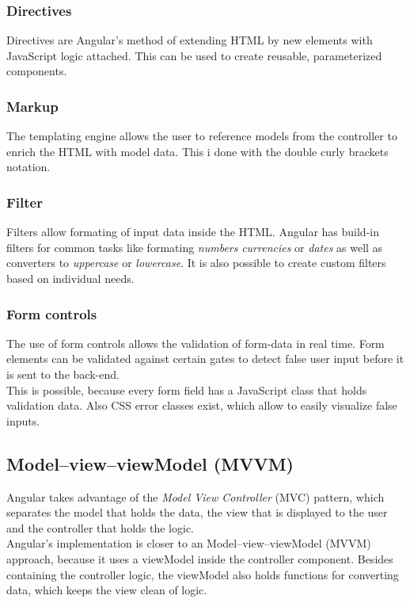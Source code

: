 \subsubsection{Directives}
Directives are Angular's method of extending HTML by new elements with JavaScript logic attached. This can be used to create reusable, parameterized components.

\subsubsection{Markup}
The templating engine allows the user to reference models from the controller to enrich the HTML with model data. This i done with the double curly brackets notation.

\subsubsection{Filter}
Filters allow formating of input data inside the HTML. Angular has build-in filters for common tasks like formating \textit{numbers} \textit{currencies} or \textit{dates} as well as converters to \textit{uppercase} or \textit{lowercase}. It is also possible to create custom filters based on individual needs.

\subsubsection{Form controls}
The use of form controls allows the validation of form-data in real time. Form elements can be validated against certain gates to detect false user input before it is sent to the back-end.\\
This is possible, because every form field has a JavaScript class that holds validation data. Also CSS error classes exist, which allow to easily visualize false inputs.


\subsection{Model–view–viewModel (MVVM)}
Angular takes advantage of the \textit{Model View Controller} (MVC) pattern, which separates the model that holds the data, the view that is displayed to the user and the controller that holds the logic.\\
Angular's implementation is closer to an Model–view–viewModel (MVVM) approach, because it uses a viewModel inside the controller component. Besides containing the controller logic, the viewModel also holds functions for converting data, which keeps the view clean of logic.

